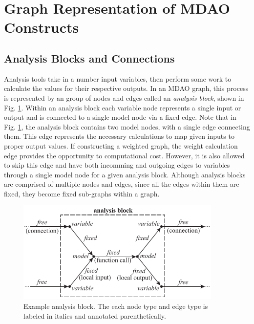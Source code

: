 \section{Graph Representation of MDAO Constructs}

\subsection{Analysis Blocks and Connections}

Analysis tools take in a number input variables, then perform some work to calculate 
the values for their respective outputs. In an MDAO graph, this process is 
represented by an group of nodes and edges called an \emph{analysis block}, 
shown in Fig. \ref{f:analysis block}. Within an analysis block each variable 
node represents a single input or output and is connected 
to a single model node via a fixed edge. Note that in Fig. \ref{f:analysis block}, 
the analysis block contains two model nodes, with a single edge connecting them. 
This edge represents the necessary calculations to map given inputs 
to proper output values. If constructing a weighted graph, the weight calculation edge 
provides the opportunity to computational cost. However, it is also allowed to skip 
this edge and have both incomming and outgoing edges to variables through a single model 
node for a given analysis block. Although analysis blocks are comprised of multiple nodes and edges, since all 
the edges within them are fixed, they become fixed sub-graphs within a graph.

\begin{figure}[htb!]
    \begin{center}
    \includegraphics[width=4in]{images/analysis_block}
    \end{center}
    \vspace{-10pt}
\caption{Example analysis block. The each node type and edge type is labeled in italics and annotated parenthetically.}
\label{f:analysis block}
\end{figure}

